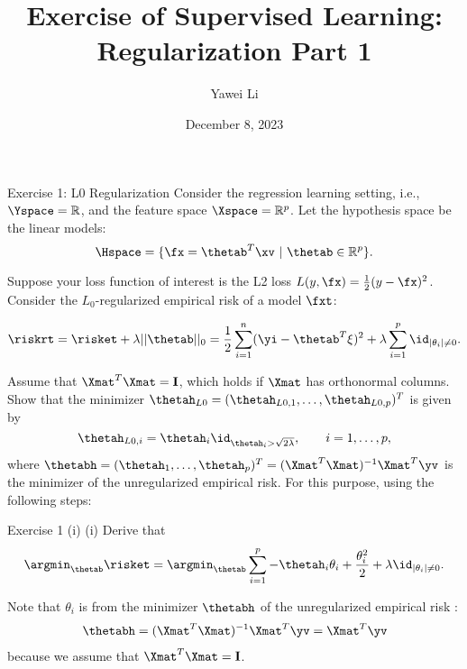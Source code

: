 \documentclass[aspectratio=169]{beamer}
\title[]{\textbf{Exercise of Supervised Learning: \\ Regularization Part 1}}
\author{Yawei Li}
\institute[LMU]
{
\\
  \texttt{yawei.li@stat.uni-muenchen.de}
}
\date{December 8, 2023}
\newcommand{\thetahi}{\thetah_i}
\newcommand{\thetai}{\theta_i}
\newcommand{\thetainnz}{\id_{|\theta_i| \neq 0}}
\newcommand{\Imat}{\mathbf{I}}
\newcommand{\sumip}{\sum_{i=1}^p}
\begin{document}
\begin{frame}
\titlepage

\end{frame}



\begin{frame}{Exercise 1: L0 Regularization}
	\small
	Consider the regression learning setting, i.e., $\Yspace = \mathbb{R}$, and the feature space $\Xspace = \mathbb{R}^p$. Let the hypothesis space be the linear models: $$\Hspace = \{ \fx = \thetab^T \xv \ | \ \thetab \in \mathbb{R}^p \}.$$
	
	Suppose your loss function of interest is the L2 loss $L(y, \fx) = \frac{1}{2} (y - \fx)^2$. Consider the $L_0$-regularized empirical risk of a model $\fxt$: 
	
	$$
		\riskrt = \risket + \lambda ||\thetab ||_0 = \frac{1}{2} \sum_{i=1}^n (\yi - \thetab^T \xi )^2 + \lambda \sum_{i=1}^p \thetainnz.
	$$
	
	Assume that $\Xmat^T \Xmat = \Imat$, which holds if $\Xmat$ has orthonormal columns. Show that the minimizer $\thetah_{L0} = (\thetah_{L0, 1}, \ldots, \thetah_{L0, p})^T$ is given by 
	$$
		\thetah_{L0, i} = \thetahi \id_{\thetahi > \sqrt{2 \lambda}}, \qquad i = 1, \ldots, p,
	$$
	where $\thetabh = (\thetah_1, \ldots, \thetah_p)^T = (\Xmat^T \Xmat)^{-1} \Xmat^T \yv$ is the minimizer of the unregularized empirical risk. For this purpose, using the following steps:
	
\end{frame}

\begin{frame}{Exercise 1 (i)}
	(i) Derive that 
	\begin{align*}
		\argmin_{\thetab} \risket = \argmin_{\thetab} \sumip - \thetahi \thetai + \frac{\thetai^2}{2} + \lambda \thetainnz.
	\end{align*}
	
	Note that $\thetai$ is from the minimizer $\thetabh$ of the unregularized empirical risk :
	\begin{align*}
		\thetabh = (\Xmat^T \Xmat)^{-1} \Xmat^T \yv = \Xmat^T \yv
	\end{align*}
	because we assume that $\Xmat^T \Xmat = \Imat$.
\end{frame}
\end{document}

